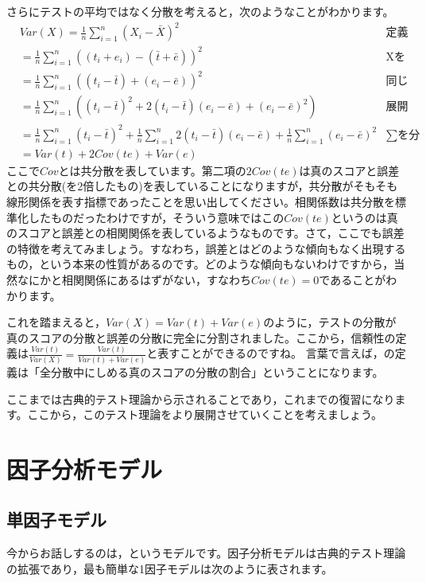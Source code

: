 \documentclass{ltjsbook}
\begin{document}
さらにテストの平均ではなく分散を考えると，次のようなことがわかります。
\begin{align*}
    &           Var(X)  =  \frac{1}{n}\sum_{i=1}^n (X_i - \bar{X})^2 & \mbox{定義より} \\
    &                       = \frac{1}{n}\sum_{i=1}^n  ((t_i + e_i) - (\bar{t} + \bar{e}))^2 & \mbox{Xをテスト理論のモデルに} \\
    &                       = \frac{1}{n}\sum_{i=1}^n (  (t_i - \bar{t}) + (e_i - \bar{e}) )^2 & \mbox{同じ記号でまとめる} \\
    &                       = \frac{1}{n}\sum_{i=1}^n (  (t_i - \bar{t})^2 + 2(t_i - \bar{t})(e_i - \bar{e}) + (e_i - \bar{e})^2  ) & \mbox{展開する}\\
    &                       = \frac{1}{n}\sum_{i=1}^n (t_i - \bar{t})^2 +\frac{1}{n}\sum_{i=1}^n 2(t_i - \bar{t})(e_i - \bar{e})  + \frac{1}{n}\sum_{i=1}^n (e_i - \bar{e})^2 & \mbox{$\sum$を分配} \\
    &                       =  Var(t) + 2Cov(te) + Var(e)
\end{align*}
ここで$Cov$とは共分散を表しています。第二項の$2Cov(te)$は真のスコアと誤差との共分散(を2倍したもの)を表していることになりますが，共分散がそもそも線形関係を表す指標であったことを思い出してください。相関係数は共分散を標準化したものだったわけですが，そういう意味ではこの$Cov(te)$というのは真のスコアと誤差との相関関係を表しているようなものです。さて，ここでも誤差の特徴を考えてみましょう。すなわち，誤差とはどのような傾向もなく出現するもの，という本来の性質があるのです。どのような傾向もないわけですから，当然なにかと相関関係にあるはずがない，すなわち$Cov(te)=0$であることがわかります。

これを踏まえると，$Var(X)=Var(t)+Var(e)$のように，テストの分散が真のスコアの分散と誤差の分散に完全に分割されました。ここから，信頼性の定義は$\frac{Var(t)}{Var(X)}=\frac{Var(t)}{Var(t)+Var(e)}$と表すことができるのですね。
言葉で言えば，の定義は「全分散中にしめる真のスコアの分散の割合」ということになります。

ここまでは古典的テスト理論から示されることであり，これまでの復習になります。ここから，このテスト理論をより展開させていくことを考えましょう。

\section{因子分析モデル}
\subsection{単因子モデル}
今からお話しするのは，というモデルです。因子分析モデルは古典的テスト理論の拡張であり，最も簡単な1因子モデルは次のように表されます。
\end{document}
